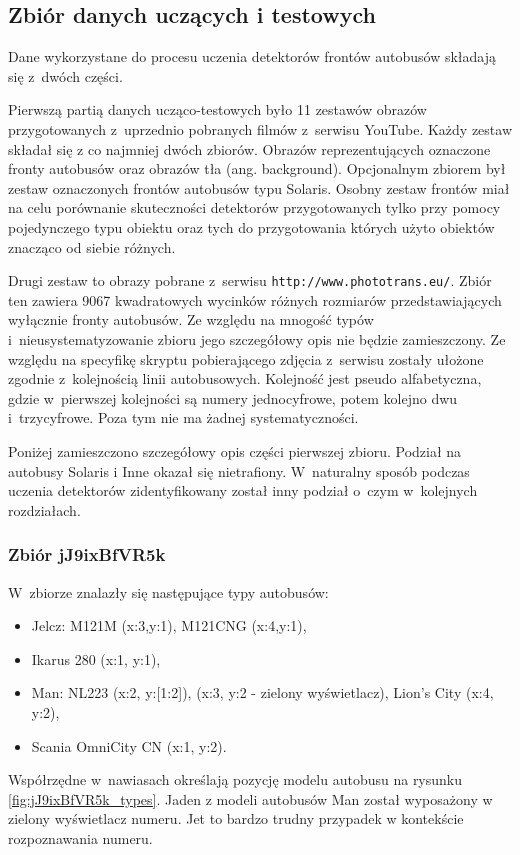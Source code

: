 \subsection{Zbiór danych uczących i testowych}

Dane wykorzystane do procesu uczenia detektorów frontów autobusów
składają się z~dwóch części.

Pierwszą partią danych ucząco-testowych było 11 zestawów obrazów
przygotowanych z~uprzednio pobranych filmów z~serwisu YouTube.
Każdy zestaw składał się z co najmniej dwóch zbiorów. Obrazów 
reprezentujących oznaczone fronty autobusów oraz obrazów tła
(ang. background). Opcjonalnym zbiorem był zestaw oznaczonych 
frontów autobusów typu Solaris. Osobny zestaw frontów miał na celu
porównanie skuteczności detektorów przygotowanych tylko przy pomocy
pojedynczego typu obiektu oraz tych do przygotowania których użyto
obiektów znacząco od siebie różnych.

Drugi zestaw to obrazy pobrane z~serwisu \verb|http://www.phototrans.eu/|.
Zbiór ten zawiera 9067 kwadratowych wycinków różnych rozmiarów
przedstawiających wyłącznie fronty autobusów. Ze względu na mnogość
typów i~nieusystematyzowanie zbioru jego szczegółowy opis nie będzie
zamieszczony. Ze względu na specyfikę skryptu pobierającego zdjęcia
z~serwisu zostały ułożone zgodnie z~kolejnością linii autobusowych.
Kolejność jest pseudo alfabetyczna, gdzie w~pierwszej kolejności
są numery jednocyfrowe, potem kolejno dwu i~trzycyfrowe. Poza tym 
nie ma żadnej systematyczności.

Poniżej zamieszczono szczegółowy opis części pierwszej zbioru.
Podział na autobusy Solaris i Inne okazał się nietrafiony. 
W~naturalny sposób podczas uczenia detektorów zidentyfikowany został 
inny podział o~czym w~kolejnych rozdziałach.

\subsubsection{Zbiór jJ9ixBfVR5k}

W~zbiorze znalazły się następujące typy autobusów: 
\begin{itemize}
    \item Jelcz: M121M (x:3,y:1), M121CNG (x:4,y:1),
    \item Ikarus 280 (x:1, y:1),
    \item Man: NL223 (x:2, y:[1:2]), (x:3, y:2 - zielony wyświetlacz),
        Lion's City (x:4, y:2),
    \item Scania OmniCity CN (x:1, y:2). 
\end{itemize}
Współrzędne w~nawiasach określają pozycję modelu autobusu na rysunku
\ref{fig:jJ9ixBfVR5k_types}.
Jaden z modeli autobusów Man został wyposażony w zielony wyświetlacz numeru.
Jet to bardzo trudny przypadek w kontekście rozpoznawania numeru.


